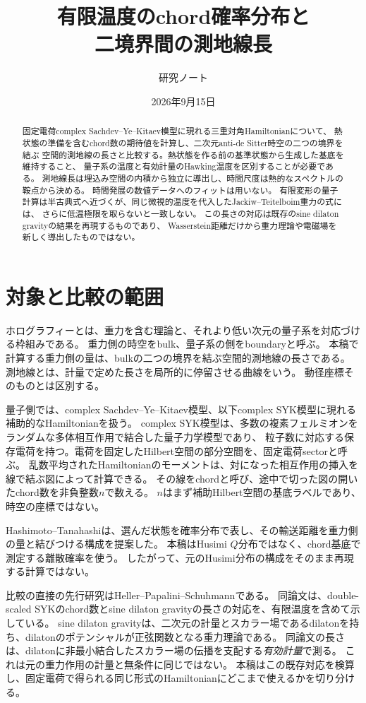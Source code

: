 \documentclass[a4paper,11pt]{ltjsarticle}
\title{有限温度のchord確率分布と\\二境界間の測地線長}
\author{研究ノート}
\date{2026年9月15日}
\numberwithin{equation}{section}
\begin{document}
\maketitle
\begin{abstract}
固定電荷complex Sachdev--Ye--Kitaev模型に現れる三重対角Hamiltonianについて、
熱状態の準備を含むchord数の期待値を計算し、二次元anti-de Sitter時空の二つの境界を結ぶ
空間的測地線の長さと比較する。熱状態を作る前の基準状態から生成した基底を維持すること、
量子系の温度と有効計量のHawking温度を区別することが必要である。
測地線長は埋込み空間の内積から独立に導出し、時間尺度は熱的なスペクトルの鞍点から決める。
時間発展の数値データへのフィットは用いない。
有限変形の量子計算は半古典式へ近づくが、同じ微視的温度を代入したJackiw--Teitelboim重力の式には、
さらに低温極限を取らないと一致しない。
この長さの対応は既存のsine dilaton gravityの結果を再現するものであり、
Wasserstein距離だけから重力理論や電磁場を新しく導出したものではない。
\end{abstract}
\tableofcontents

\section{対象と比較の範囲}
ホログラフィーとは、重力を含む理論と、それより低い次元の量子系を対応づける枠組みである。
重力側の時空をbulk、量子系の側をboundaryと呼ぶ。
本稿で計算する重力側の量は、bulkの二つの境界を結ぶ空間的測地線の長さである。
測地線とは、計量で定めた長さを局所的に停留させる曲線をいう。
動径座標そのものとは区別する。

量子側では、complex Sachdev--Ye--Kitaev模型、以下complex SYK模型に現れる補助的なHamiltonianを扱う。
complex SYK模型は、多数の複素フェルミオンをランダムな多体相互作用で結合した量子力学模型であり、
粒子数に対応する保存電荷を持つ。電荷を固定したHilbert空間の部分空間を、固定電荷sectorと呼ぶ。
乱数平均されたHamiltonianのモーメントは、対になった相互作用の挿入を線で結ぶ図によって計算できる。
その線をchordと呼び、途中で切った図の開いたchord数を非負整数$n$で数える。
$n$はまず補助Hilbert空間の基底ラベルであり、時空の座標ではない\cite{Forste}。

Hashimoto--Tanahashiは、選んだ状態を確率分布で表し、その輸送距離を重力側の量と結びつける構成を提案した\cite{Hashimoto}。
本稿はHusimi $Q$分布ではなく、chord基底で測定する離散確率を使う。
したがって、元のHusimi分布の構成をそのまま再現する計算ではない。

比較の直接の先行研究はHeller--Papalini--Schuhmannである\cite{Heller}。
同論文は、double-scaled SYKのchord数とsine dilaton gravityの長さの対応を、有限温度を含めて示している。
sine dilaton gravityは、二次元の計量とスカラー場であるdilatonを持ち、dilatonのポテンシャルが正弦関数となる重力理論である。
同論文の長さは、dilatonに非最小結合したスカラー場の伝播を支配する\emph{有効計量}で測る。
これは元の重力作用の計量と無条件に同じではない。
本稿はこの既存対応を検算し、固定電荷で得られる同じ形式のHamiltonianにどこまで使えるかを切り分ける。
\end{document}
